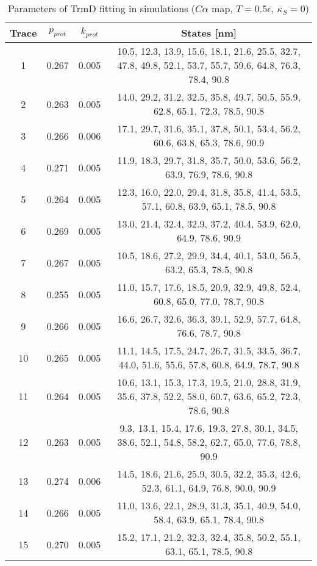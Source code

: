 \begin{table}
    \tiny
    \centering
    \caption{Parameters of TrmD fitting in simulations ($C\alpha$ map, $T=0.5\epsilon$, $\kappa_S=0$)}
    \label{tab:trmd-cd-parameters}
    \begin{tabular}{c|c|c|c}
        \textbf{Trace} & \textbf{$p_{prot}$} & \textbf{$k_{prot}$} & \textbf{States [nm]}\\\hline
        1 & 0.267 & 0.005 & 10.5, 12.3, 13.9, 15.6, 18.1, 21.6, 25.5, 32.7, 47.8, 49.8, 52.1, 53.7, 55.7, 59.6, 64.8, 76.3, 78.4, 90.8\\
        2 & 0.263 & 0.005 & 14.0, 29.2, 31.2, 32.5, 35.8, 49.7, 50.5, 55.9, 62.8, 65.1, 72.3, 78.5, 90.8\\
        3 & 0.266 & 0.006 & 17.1, 29.7, 31.6, 35.1, 37.8, 50.1, 53.4, 56.2, 60.6, 63.8, 65.3, 78.6, 90.9\\
        4 & 0.271 & 0.005 & 11.9, 18.3, 29.7, 31.8, 35.7, 50.0, 53.6, 56.2, 63.9, 76.9, 78.6, 90.8\\
        5 & 0.264 & 0.005 & 12.3, 16.0, 22.0, 29.4, 31.8, 35.8, 41.4, 53.5, 57.1, 60.8, 63.9, 65.1, 78.5, 90.8\\
        6 & 0.269 & 0.005 & 13.0, 21.4, 32.4, 32.9, 37.2, 40.4, 53.9, 62.0, 64.9, 78.6, 90.9\\
        7 & 0.267 & 0.005 & 10.5, 18.6, 27.2, 29.9, 34.4, 40.1, 53.0, 56.5, 63.2, 65.3, 78.5, 90.8\\
        8 & 0.255 & 0.005 & 11.0, 15.7, 17.6, 18.5, 20.9, 32.9, 49.8, 52.4, 60.8, 65.0, 77.0, 78.7, 90.8\\
        9 & 0.266 & 0.005 & 16.6, 26.7, 32.6, 36.3, 39.1, 52.9, 57.7, 64.8, 76.6, 78.7, 90.8\\
        10 & 0.265 & 0.005 & 11.1, 14.5, 17.5, 24.7, 26.7, 31.5, 33.5, 36.7, 44.0, 51.6, 55.6, 57.8, 60.8, 64.9, 78.7, 90.8\\
        11 & 0.264 & 0.005 & 10.6, 13.1, 15.3, 17.3, 19.5, 21.0, 28.8, 31.9, 35.6, 37.8, 52.2, 58.0, 60.7, 63.6, 65.2, 72.3, 78.6, 90.8\\
        12 & 0.263 & 0.005 & 9.3, 13.1, 15.4, 17.6, 19.3, 27.8, 30.1, 34.5, 38.6, 52.1, 54.8, 58.2, 62.7, 65.0, 77.6, 78.8, 90.9\\
        13 & 0.274 & 0.006 & 14.5, 18.6, 21.6, 25.9, 30.5, 32.2, 35.3, 42.6, 52.3, 61.1, 64.9, 76.8, 90.0, 90.9\\
        14 & 0.266 & 0.005 & 11.0, 13.6, 22.1, 28.9, 31.3, 35.1, 40.9, 54.0, 58.4, 63.9, 65.1, 78.4, 90.8\\
        15 & 0.270 & 0.005 & 15.2, 17.1, 21.2, 32.3, 32.4, 35.8, 50.2, 55.1, 63.1, 65.1, 78.5, 90.8\\\hline
    \end{tabular}
\end{table}

